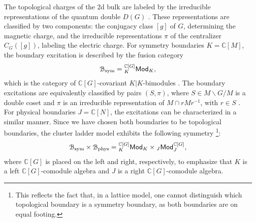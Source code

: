 \documentclass[a4paper,11pt]{article}
\theoremstyle{theorem}
\theoremstyle{remark}
\newcommand\eB           {\EuScript{B}}
\newcommand{\Cbb}{\mathbb{C}}
\newcommand{\Mod}{\mathsf{Mod}}
\begin{document}
The topological charges of the 2d bulk are labeled by the irreducible representations of the quantum double \( D(G) \) \cite{Kitaev2003,Beigi2011the,Cong2017,Bombin2008family,jia2023boundary,Jia2023weak}. These representations are classified by two components: the conjugacy class \( [g] \) of \( G \), determining the magnetic charge, and the irreducible representations \( \pi \) of the centralizer \( C_G([g]) \), labeling the electric charge.
For symmetry boundaries $K=\Cbb[M]$, the boundary excitation is described by the fusion category 
\begin{equation}
    \eB_{\rm sym}={^{\Cbb[G]}_K}\Mod_K ,
\end{equation}
which is the category of \(\Cbb[G]\)-covariant \(K|K\)-bimodules \cite{andruskiewitsch2007module,jia2023boundary,Jia2023weak}. The boundary excitations are equivalently classified by pairs \((S, \pi)\), where \(S \in M\backslash G/M\) is a double coset and \(\pi\) is an irreducible representation of \(M \cap r M r^{-1}\), with \(r \in S\) \cite{Cong2017}. For physical boundaries $J=\Cbb[N]$, the excitations can be characterized in a similar manner.
Since we have chosen both boundaries to be topological boundaries, the cluster ladder model exhibits the following symmetry \footnote{This reflects the fact that, in a lattice model, one cannot distinguish which topological boundary is a symmetry boundary, as both boundaries are on equal footing.}:
\begin{equation}
    \eB_{\rm sym} \times \eB_{\rm phys} = {^{\Cbb[G]}_K}\Mod_K \times {_J}\Mod^{\Cbb[G]}_J,
\end{equation}
where \(\Cbb[G]\) is placed on the left and right, respectively, to emphasize that \(K\) is a left \(\Cbb[G]\)-comodule algebra and \(J\) is a right \(\Cbb[G]\)-comodule algebra.
\end{document}
